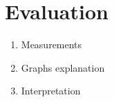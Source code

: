 \section{Evaluation}

\begin{enumerate}
  \item Measurements
  \item Graphs
  \subitem explanation
  \item Interpretation
\end{enumerate}